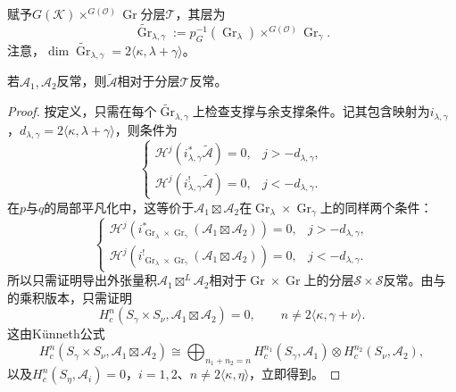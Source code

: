 赋予$G(\mathcal K)\times^{G(\mathcal O)}\operatorname{Gr}$分层$\mathcal T$，其层为
\begin{equation}\tag{1.3}\label{L22eq13}\widetilde{\operatorname{Gr}}_{\lambda,\gamma}:=p_G^{-1}(\operatorname{Gr}_\lambda)\times^{G(\mathcal O)}\operatorname{Gr}_\gamma.\end{equation}
注意，$\dim\widetilde{\operatorname{Gr}}_{\lambda,\gamma}=2\langle\kappa,\lambda+\gamma\rangle$。
\begin{lemma}\label{L22S1O1}若$\mathcal A_1,\mathcal A_2$反常，则$\widetilde{\mathcal A}$相对于分层$\mathcal T$反常。\end{lemma}
\begin{proof}
按定义，只需在每个$\widetilde{\operatorname{Gr}}_{\lambda,\gamma}$上检查支撑与余支撑条件。记其包含映射为$i_{\lambda,\gamma}$，$d_{\lambda,\gamma}=2\langle\kappa,\lambda+\gamma\rangle$，则条件为
\[\begin{cases}\mathcal H^j(i_{\lambda,\gamma}^*\widetilde{\mathcal A})=0,&j>-d_{\lambda,\gamma},\\\mathcal H^j(i_{\lambda,\gamma}^!\widetilde{\mathcal A})=0,&j<-d_{\lambda,\gamma}.\end{cases}\]
在$p$与$q$的局部平凡化中，这等价于$\mathcal A_1\boxtimes\mathcal A_2$在$\operatorname{Gr}_\lambda\times\operatorname{Gr}_\gamma$上的同样两个条件：
\[\begin{cases}\mathcal H^j(i_{\operatorname{Gr}_\lambda\times\operatorname{Gr}_\gamma}^*(\mathcal A_1\boxtimes\mathcal A_2))=0,&j>-d_{\lambda,\gamma},\\\mathcal H^j(i_{\operatorname{Gr}_\lambda\times\operatorname{Gr}_\gamma}^!(\mathcal A_1\boxtimes\mathcal A_2))=0,&j<-d_{\lambda,\gamma}.\end{cases}\]
所以只需证明导出外张量积$\mathcal A_1\boxtimes^L\mathcal A_2$相对于$\operatorname{Gr}\times\operatorname{Gr}$上的分层$\mathcal S\times\mathcal S$反常。由与的乘积版本，只需证明
\[H_c^n(S_\gamma\times S_\nu,\mathcal A_1\boxtimes\mathcal A_2)=0,\qquad n\ne2\langle\kappa,\gamma+\nu\rangle.\]
这由Künneth公式
\[H_c^n(S_\gamma\times S_\nu,\mathcal A_1\boxtimes\mathcal A_2)\cong\bigoplus_{n_1+n_2=n}H_c^{n_1}(S_\gamma,\mathcal A_1)\otimes H_c^{n_2}(S_\nu,\mathcal A_2),\]
以及$H_c^n(S_\eta,\mathcal A_i)=0$，$i=1,2$、$n\ne2\langle\kappa,\eta\rangle$，立即得到。
\end{proof}
